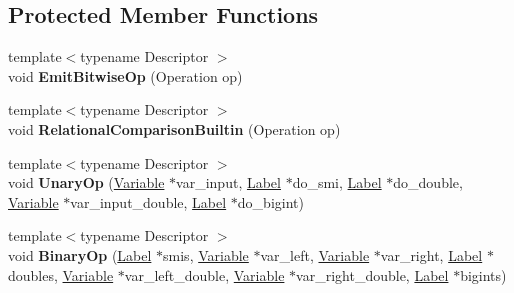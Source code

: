 \subsection*{Protected Member Functions}
\begin{DoxyCompactItemize}
\item 
\mbox{\label{classv8_1_1internal_1_1NumberBuiltinsAssembler_a6904f979d0403ac6305db62b46340750}} 
{\footnotesize template$<$typename Descriptor $>$ }\\void {\bfseries Emit\+Bitwise\+Op} (Operation op)
\item 
\mbox{\label{classv8_1_1internal_1_1NumberBuiltinsAssembler_a1731ad6718f904805951a68832a6bf32}} 
{\footnotesize template$<$typename Descriptor $>$ }\\void {\bfseries Relational\+Comparison\+Builtin} (Operation op)
\item 
\mbox{\label{classv8_1_1internal_1_1NumberBuiltinsAssembler_a4d789cfa9b1ea45140262e804de9e681}} 
{\footnotesize template$<$typename Descriptor $>$ }\\void {\bfseries Unary\+Op} (\mbox{\hyperlink{classv8_1_1internal_1_1compiler_1_1CodeAssemblerVariable}{Variable}} $\ast$var\+\_\+input, \mbox{\hyperlink{classv8_1_1internal_1_1compiler_1_1CodeAssemblerLabel}{Label}} $\ast$do\+\_\+smi, \mbox{\hyperlink{classv8_1_1internal_1_1compiler_1_1CodeAssemblerLabel}{Label}} $\ast$do\+\_\+double, \mbox{\hyperlink{classv8_1_1internal_1_1compiler_1_1CodeAssemblerVariable}{Variable}} $\ast$var\+\_\+input\+\_\+double, \mbox{\hyperlink{classv8_1_1internal_1_1compiler_1_1CodeAssemblerLabel}{Label}} $\ast$do\+\_\+bigint)
\item 
\mbox{\label{classv8_1_1internal_1_1NumberBuiltinsAssembler_a766e75aea0a5bbbc26087e026d370288}} 
{\footnotesize template$<$typename Descriptor $>$ }\\void {\bfseries Binary\+Op} (\mbox{\hyperlink{classv8_1_1internal_1_1compiler_1_1CodeAssemblerLabel}{Label}} $\ast$smis, \mbox{\hyperlink{classv8_1_1internal_1_1compiler_1_1CodeAssemblerVariable}{Variable}} $\ast$var\+\_\+left, \mbox{\hyperlink{classv8_1_1internal_1_1compiler_1_1CodeAssemblerVariable}{Variable}} $\ast$var\+\_\+right, \mbox{\hyperlink{classv8_1_1internal_1_1compiler_1_1CodeAssemblerLabel}{Label}} $\ast$doubles, \mbox{\hyperlink{classv8_1_1internal_1_1compiler_1_1CodeAssemblerVariable}{Variable}} $\ast$var\+\_\+left\+\_\+double, \mbox{\hyperlink{classv8_1_1internal_1_1compiler_1_1CodeAssemblerVariable}{Variable}} $\ast$var\+\_\+right\+\_\+double, \mbox{\hyperlink{classv8_1_1internal_1_1compiler_1_1CodeAssemblerLabel}{Label}} $\ast$bigints)
\end{DoxyCompactItemize}
